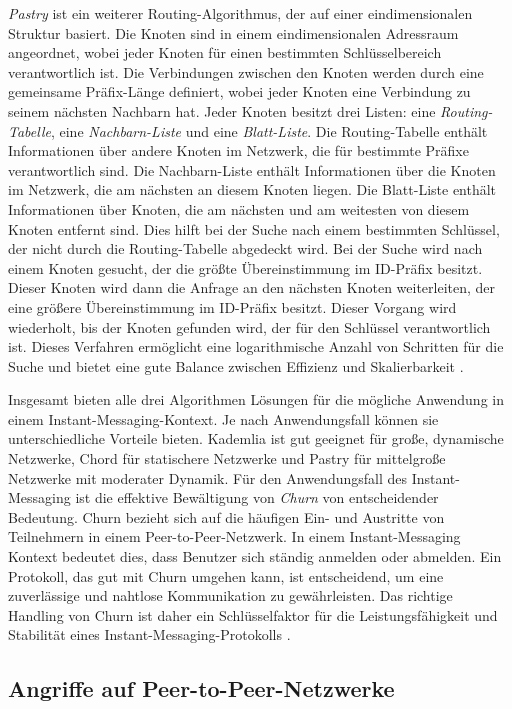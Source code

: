 \textit{Pastry} ist ein weiterer Routing-Algorithmus, der auf einer eindimensionalen Struktur basiert. Die Knoten sind in einem eindimensionalen Adressraum angeordnet, wobei jeder Knoten für einen bestimmten Schlüsselbereich verantwortlich ist. Die Verbindungen zwischen den Knoten werden durch eine gemeinsame Präfix-Länge definiert, wobei jeder Knoten eine Verbindung zu seinem nächsten Nachbarn hat. Jeder Knoten besitzt drei Listen: eine \textit{Routing-Tabelle}, eine \textit{Nachbarn-Liste} und eine \textit{Blatt-Liste}. Die Routing-Tabelle enthält Informationen über andere Knoten im Netzwerk, die für bestimmte Präfixe verantwortlich sind. Die Nachbarn-Liste enthält Informationen über die Knoten im Netzwerk, die am nächsten an diesem Knoten liegen. Die Blatt-Liste enthält Informationen über Knoten, die am nächsten und am weitesten von diesem Knoten entfernt sind. Dies hilft bei der Suche nach einem bestimmten Schlüssel, der nicht durch die Routing-Tabelle abgedeckt wird. Bei der Suche wird nach einem Knoten gesucht, der die größte Übereinstimmung im ID-Präfix besitzt. Dieser Knoten wird dann die Anfrage an den nächsten Knoten weiterleiten, der eine größere Übereinstimmung im ID-Präfix besitzt. Dieser Vorgang wird wiederholt, bis der Knoten gefunden wird, der für den Schlüssel verantwortlich ist. Dieses Verfahren ermöglicht eine logarithmische Anzahl von Schritten für die Suche und bietet eine gute Balance zwischen Effizienz und Skalierbarkeit \parencite{Rowstron_Pastry}.

Insgesamt bieten alle drei Algorithmen Lösungen für die mögliche Anwendung in einem Instant-Messaging-Kontext. Je nach Anwendungsfall können sie unterschiedliche Vorteile bieten. Kademlia ist gut geeignet für große, dynamische Netzwerke, Chord für statischere Netzwerke und Pastry für mittelgroße Netzwerke mit moderater Dynamik. Für den Anwendungsfall des Instant-Messaging ist die effektive Bewältigung von \textit{Churn} von entscheidender Bedeutung. Churn bezieht sich auf die häufigen Ein- und Austritte von Teilnehmern in einem Peer-to-Peer-Netzwerk. In einem Instant-Messaging Kontext bedeutet dies, dass Benutzer sich ständig anmelden oder abmelden. Ein Protokoll, das gut mit Churn umgehen kann, ist entscheidend, um eine zuverlässige und nahtlose Kommunikation zu gewährleisten. Das richtige Handling von Churn ist daher ein Schlüsselfaktor für die Leistungsfähigkeit und Stabilität eines Instant-Messaging-Protokolls \parencite[S. 316-317]{Peris_KademliaChurn}.


\subsection{Angriffe auf Peer-to-Peer-Netzwerke}

